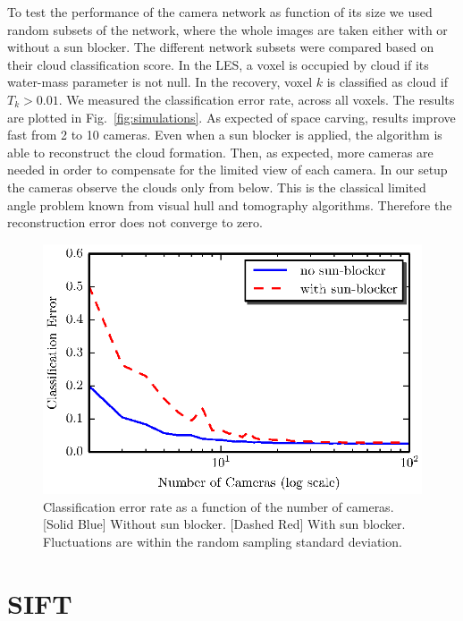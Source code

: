 \documentclass[runningheads]{llncs}
\begin{document}
To test the performance of the camera network as function of its size
we used random subsets of the network, where the whole images are
taken either with or without a sun blocker. The different network
subsets were compared based on their cloud classification score.  In
the LES, a voxel is occupied by cloud if its water-mass parameter is
not null. In the recovery, voxel $k$ is classified as cloud if
$T_k>0.01$.  We measured the classification error rate, across all
voxels.  The results are plotted in Fig.~\ref{fig:simulations}.  As
expected of space carving, results improve fast from 2 to 10
cameras. Even when a sun blocker is applied, the algorithm is able to
reconstruct the cloud formation. Then, as expected, more cameras are
needed in order to compensate for the limited view of each camera. In
our setup the cameras observe the clouds only from below. This is the
classical limited angle problem known from visual hull and tomography
algorithms. Therefore the reconstruction error does not converge to
zero.

\begin{figure}
  \begin{center}
    \includegraphics{figures/simulations.eps}
    \caption{Classification error rate as a function of the number of
      cameras. [Solid Blue] Without sun blocker. [Dashed Red] With sun
      blocker.  Fluctuations are within the random sampling standard
      deviation.}
    \label{fig:simulation}
  \end{center}
\end{figure}


\section{SIFT}
\end{document}
